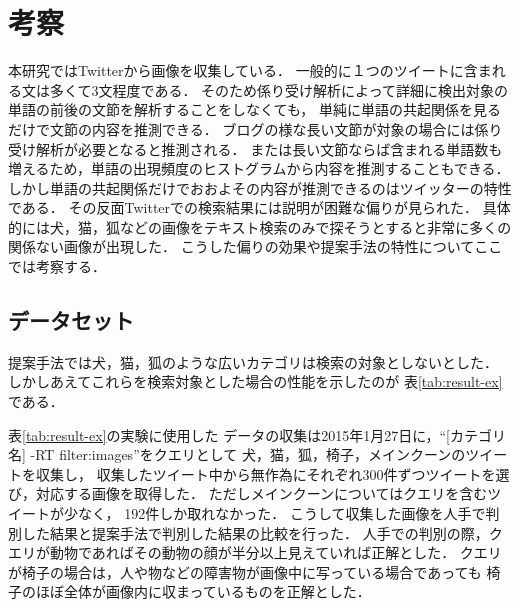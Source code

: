 \documentclass{deimj}
\begin{document}
\section{考察}
\label{sec:examination}

本研究ではTwitterから画像を収集している．
一般的に１つのツイートに含まれる文は多くて3文程度である．
そのため係り受け解析によって詳細に検出対象の単語の前後の文節を解析することをしなくても，
単純に単語の共起関係を見るだけで文節の内容を推測できる．
ブログの様な長い文節が対象の場合には係り受け解析が必要となると推測される．
または長い文節ならば含まれる単語数も増えるため，単語の出現頻度のヒストグラムから内容を推測することもできる．
しかし単語の共起関係だけでおおよその内容が推測できるのはツイッターの特性である．
その反面Twitterでの検索結果には説明が困難な偏りが見られた．
具体的には犬，猫，狐などの画像をテキスト検索のみで探そうとすると非常に多くの関係ない画像が出現した．
こうした偏りの効果や提案手法の特性についてここでは考察する．



\subsection{データセット}

提案手法では犬，猫，狐のような広いカテゴリは検索の対象としないとした．
しかしあえてこれらを検索対象とした場合の性能を示したのが
表\ref{tab:result-ex}である．

表\ref{tab:result-ex}の実験に使用した
データの収集は2015年1月27日に，“[カテゴリ名] -RT filter:images”をクエリとして
犬，猫，狐，椅子，メインクーンのツイートを収集し，
収集したツイート中から無作為にそれぞれ300件ずつツイートを選び，対応する画像を取得した．
ただしメインクーンについてはクエリを含むツイートが少なく，
192件しか取れなかった．
%
こうして収集した画像を人手で判別した結果と提案手法で判別した結果の比較を行った．
人手での判別の際，クエリが動物であればその動物の顔が半分以上見えていれば正解とした．
クエリが椅子の場合は，人や物などの障害物が画像中に写っている場合であっても
椅子のほぼ全体が画像内に収まっているものを正解とした．
\end{document}
